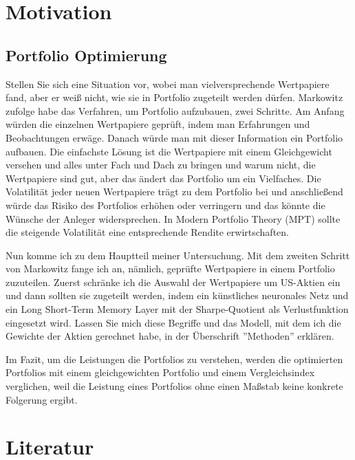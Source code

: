 \documentclass[12pt]{article}
\begin{document}
    \section{Motivation}

        \subsection{Portfolio Optimierung}
            
            Stellen Sie sich eine Situation vor, wobei man vielversprechende Wertpapiere fand, 
            aber er weiß nicht, wie sie in Portfolio zugeteilt werden dürfen. 
            Markowitz \cite{markowitz1952} zufolge habe das Verfahren, um Portfolio aufzubauen, zwei Schritte. 
            Am Anfang würden die einzelnen Wertpapiere geprüft, indem man Erfahrungen und Beobachtungen erwäge. 
            Danach würde man mit dieser Information ein Portfolio aufbauen. 
            Die einfachste Lösung ist die Wertpapiere mit einem Gleichgewicht versehen und 
            alles unter Fach und Dach zu bringen und warum nicht, die Wertpapiere sind gut, aber das ändert das Portfolio um ein Vielfaches.
            Die Volatilität jeder neuen Wertpapiere trägt zu dem Portfolio bei und
            anschließend würde das Risiko des Portfolios erhöhen oder verringern und das könnte die Wünsche der Anleger widersprechen. 
            In Modern Portfolio Theory (MPT) sollte die steigende Volatilität eine entsprechende Rendite erwirtschaften. 

            Nun komme ich zu dem Hauptteil meiner Untersuchung. 
            Mit dem zweiten Schritt von Markowitz fange ich an, nämlich, geprüfte Wertpapiere in einem Portfolio zuzuteilen. 
            Zuerst schränke ich die Auswahl der Wertpapiere um US-Aktien ein und
            dann sollten sie zugeteilt werden, indem ein künstliches neuronales Netz und
            ein Long Short-Term Memory Layer mit der Sharpe-Quotient als Verlustfunktion eingesetzt wird. 
            Lassen Sie mich diese Begriffe und das Modell, mit dem ich die Gewichte der Aktien gerechnet habe, 
            in der Überschrift ''Methoden'' erklären.

            Im Fazit, um die Leistungen die Portfolios zu verstehen, 
            werden die optimierten Portfolios mit einem gleichgewichten Portfolio und 
            einem Vergleichsindex verglichen, weil die Leistung eines Portfolios ohne einen Maßstab keine konkrete Folgerung ergibt.

    \section{Literatur}
\end{document}
